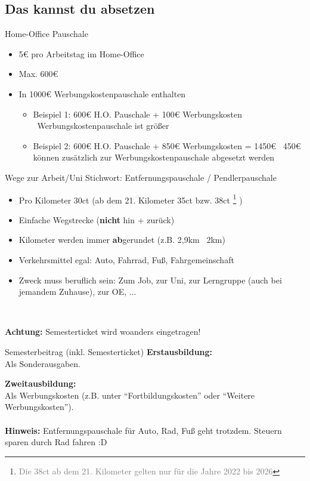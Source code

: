 \documentclass{beamer}
\newcommand{\n}{\hfill\\\vspace{0.25cm}}
\let\oldfootnote\footnote
\renewcommand{\footnote}[1]
{%
	\oldfootnote
	{
		\tiny
		\textcolor{gray}{#1}
	}%
}
\begin{document}
		\subsection{Das kannst du absetzen}
		
			\begin{frame}{Home-Office Pauschale}
				\begin{itemize}
					\item 5€ pro Arbeitstag im Home-Office
					\item Max. 600€
					\item In 1000€ Werbungskostenpauschale enthalten
					\begin{itemize}
						\item Beispiel 1: 600€ H.O. Pauschale + 100€ Werbungskosten \textrightarrow\ Werbungskostenpauschale ist größer
						\item Beispiel 2: 600€ H.O. Pauschale + 850€ Werbungskosten = 1450€ \textrightarrow\ 450€ können zusätzlich zur Werbungskostenpauschale abgesetzt werden
					\end{itemize}
				\end{itemize}
			\end{frame}
		
			\begin{frame}{Wege zur Arbeit/Uni}
				Stichwort: Entfernungspauschale / Pendlerpauschale\n
				
				\begin{itemize}
					\item Pro Kilometer 30ct (ab dem 21. Kilometer 35ct bzw. 38ct\footnote{Die 38ct ab dem 21. Kilometer gelten nur für die Jahre 2022 bis 2026})
					\item Einfache Wegstrecke (\textbf{nicht} hin + zurück)
					\item Kilometer werden immer \textbf{ab}gerundet (z.B. 2,9km \textrightarrow\ 2km)
					\item Verkehrsmittel egal: Auto, Fahrrad, Fuß, Fahrgemeinschaft
					\item Zweck muss beruflich sein: Zum Job, zur Uni, zur Lerngruppe (auch bei jemandem Zuhause), zur OE, ...
				\end{itemize}\n
				
				\textbf{Achtung:} Semesterticket wird woanders eingetragen!
			\end{frame}
		
			\begin{frame}{Semesterbeitrag (inkl. Semesterticket)}
				\textbf{Erstausbildung:}\\
				Als Sonderausgaben.\n
				
				\textbf{Zweitausbildung:}\\
				Als Werbungskosten (z.B. unter "`Fortbildungskosten"' oder "`Weitere Werbungskosten"').\n
				\hfill\\
				\textbf{Hinweis:} Entfernungspauschale für Auto, Rad, Fuß geht trotzdem. Steuern sparen durch Rad fahren :D
			\end{frame}
		
\end{document}
